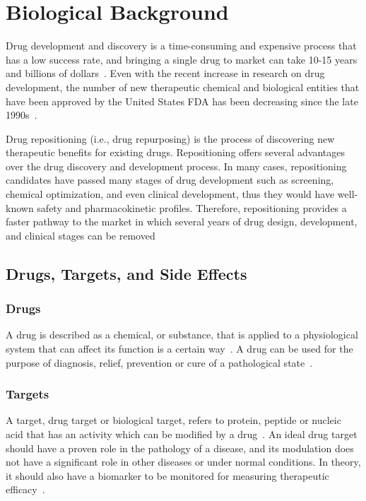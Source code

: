\chapter{Biological Background}
\label{ch:biological}

Drug development and discovery is a time-consuming and expensive process that has a low success rate, and bringing a single drug to market can take 10-15 years and billions of dollars~\cite{arrowsmith_phase_2011, arrowsmith_phase_2013}.
Even with the recent increase in research on drug development, the number of new therapeutic chemical and biological entities that have been approved by the United States \ac{FDA} has been decreasing since the late 1990s~\cite{wang_exploring_2014}.

Drug repositioning (i.e., drug repurposing) is the process of discovering new therapeutic benefits for existing drugs.
Repositioning offers several advantages over the drug discovery and development process.
In many cases, repositioning candidates have passed many stages of drug development such as screening, chemical optimization, and even clinical development, thus they would have well-known safety and pharmacokinetic profiles.
Therefore, repositioning provides a faster pathway to the market in which several years of drug design, development, and clinical stages can be removed~\cite{ashburn_drug_2004}

\section{Drugs, Targets, and Side Effects}

\subsection{Drugs}

A drug is described as a chemical, or substance, that is applied to a physiological system that can affect its function is a certain way~\cite{rang_rang_2014}.
A drug can be used for the purpose of diagnosis, relief, prevention or cure of a pathological state~\cite{satoskar_pharmacology_1973}.

\subsection{Targets}

A target, drug target or biological target, refers to protein, peptide or nucleic acid that has an activity which can be modified by a drug~\cite{gashaw_what_2011}.
An ideal drug target should have a proven role in the pathology of a disease, and its modulation does not have a significant role in other diseases or under normal conditions.
In theory, it should also have a biomarker to be monitored for measuring therapeutic efficacy~\cite{gashaw_what_2011}.

